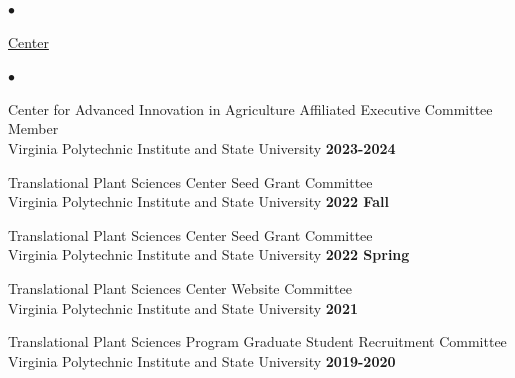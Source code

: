\documentclass[margin,line,10pt]{res}
\newenvironment{list2}{
  \begin{list}{$\bullet$}{%
      \setlength{\itemsep}{0in}
      \setlength{\parsep}{0in} \setlength{\parskip}{0in}
      \setlength{\topsep}{0in} \setlength{\partopsep}{0in} 
      \setlength{\leftmargin}{0.2in}}}{\end{list}}
\begin{document}
\begin{resume}
\begin{list2}
  \end{list2}
  
  




\begin{flushleft}
  \hspace{0.3cm} \underline{Center}
\end{flushleft}
\begin{list2}

  \item Center for Advanced Innovation in Agriculture Affiliated Executive Committee Member \\
  Virginia Polytechnic Institute and State University  \hfill {\bf 2023-2024}\\

  \vspace{0.3cm}

    \item Translational Plant Sciences Center Seed Grant Committee \\
  Virginia Polytechnic Institute and State University  \hfill \textbf{2022 Fall}\\

  \vspace{0.3cm}
  
  \item Translational Plant Sciences Center Seed Grant Committee \\
  Virginia Polytechnic Institute and State University  \hfill \textbf{2022 Spring}\\

  \vspace{0.3cm}

\item Translational Plant Sciences Center Website Committee \\
  Virginia Polytechnic Institute and State University  \hfill \textbf{2021}\\

  \vspace{0.3cm}


  \item Translational Plant Sciences Program Graduate Student Recruitment Committee \\
  Virginia Polytechnic Institute and State University  \hfill \textbf{2019-2020}\\

  \vspace{0.3cm}
  

\end{list2}
\end{resume}
\end{document}
